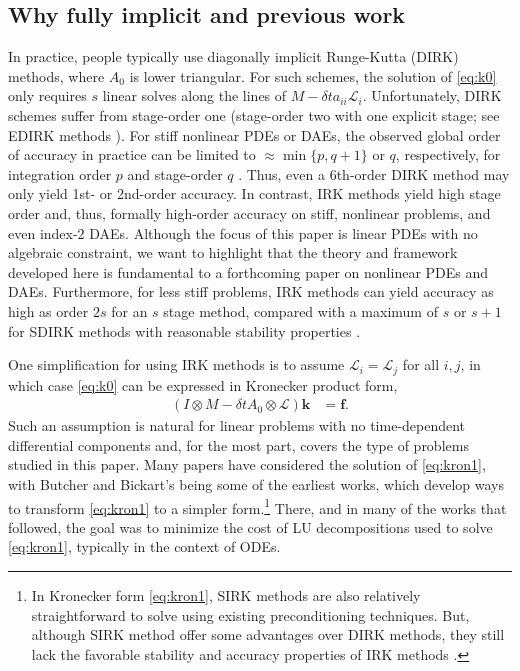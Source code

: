 \documentclass[review]{siamart}
\begin{document}
\subsection{Why fully implicit and previous work}\label{sec:intro:hist}

In practice, people typically use
diagonally implicit Runge-Kutta (DIRK) methods, where $A_0$ is lower triangular.
For such schemes, the solution of \eqref{eq:k0} only requires $s$ linear
solves along the lines of $ M - \delta ta_{ii}\mathcal{L}_i$. Unfortunately, DIRK
schemes suffer from stage-order one (stage-order two with one explicit stage; see
EDIRK methods \cite{butcher00}). For stiff nonlinear PDEs or DAEs, the observed
global order of accuracy
in practice can be limited to $\approx \min\{ p, q+1\}$ or $q$, respectively, for
integration order $p$ and stage-order $q$ \cite{hairer96,kennedy16}. Thus, even a
6th-order DIRK method may only yield 1st- or 2nd-order accuracy. In contrast, IRK
methods yield high stage order and, thus, formally high-order accuracy on stiff,
nonlinear problems, and even index-2 DAEs. Although the focus of this paper is
linear PDEs with no algebraic constraint, we want to highlight that the theory
and framework developed here is fundamental to a forthcoming paper on
nonlinear PDEs and DAEs. Furthermore, for less stiff
problems, IRK methods can yield accuracy as high as order $2s$ for an $s$ stage method,
compared with a maximum of $s$ or $s+1$ for SDIRK methods with reasonable stability
properties \cite[Section IV.6]{hairer96}.

One simplification for using IRK methods is to assume $\mathcal{L}_i =
\mathcal{L}_j$ for all $i,j$, in which case \eqref{eq:k0} can be expressed in
Kronecker product form,
%
\begin{align}\label{eq:kron1}
(I\otimes M - \delta t A_0\otimes \mathcal{L})\mathbf{k} & = \mathbf{f}.
\end{align}
%
Such an assumption is natural for linear problems with no time-dependent differential
components and, for the most part, covers the type of problems studied in this paper.
Many papers have considered the solution of \eqref{eq:kron1}, with Butcher
\cite{butcher76} and Bickart's \cite{bickart77} being some of the earliest works,
which develop ways to transform \eqref{eq:kron1} to a simpler form.\footnote{
In Kronecker form \eqref{eq:kron1}, SIRK methods \cite{norsett1976runge} are also
relatively straightforward to solve using existing preconditioning techniques.
But, although SIRK method offer some advantages over DIRK methods, they still lack
the favorable stability and accuracy properties of IRK methods \cite{burrage82,orel91}.}
There, and in many of the works that followed, the goal was to minimize the cost of LU
decompositions used to solve \eqref{eq:kron1}, typically in the context of ODEs.
\end{document}
